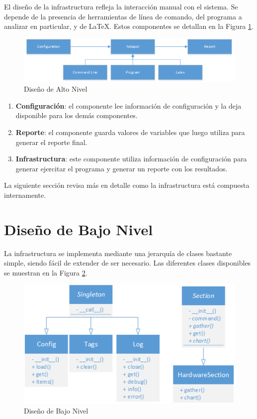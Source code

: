 \documentclass[a4paper]{report}
\begin{document}
El diseño de la infrastructura refleja la interacción manual con el sistema. 
Se depende de la presencia de herramientas de línea de comando, del programa a analizar en particular, y de \LaTeX.
Estos componentes se detallan en la Figura \ref{fig:hotspot-hld}.

\begin{figure}[H]
\begin{center}
\includegraphics[width=\textwidth]{hotspot-hld.png}
\caption{Diseño de Alto Nivel}
\label{fig:hotspot-hld}
\end{center}
\end{figure}

\begin{enumerate}
\item{\bf Configuración}: el componente lee información de configuración y la deja disponible para los demás componentes.
\item{\bf Reporte}: el componente guarda valores de variables que luego utiliza para generar el reporte final. 
\item{\bf Infrastructura}: este componente utiliza información de configuración para generar ejercitar el programa y generar un reporte con los resultados.
\end{enumerate}

La siguiente sección revisa más en detalle como la infrastructura está compuesta internamente.

\section{Diseño de Bajo Nivel}

La infrastructura se implementa mediante una jerarquía de clases bastante simple, siendo fácil de extender de ser necesario.
Las diferentes clases disponibles se muestran en la Figura \ref{fig:hotspot-lld}.

\begin{figure}[H]
\begin{center}
\includegraphics[width=\textwidth]{hotspot-lld.png}
\caption{Diseño de Bajo Nivel}
\label{fig:hotspot-lld}
\end{center}
\end{figure}
\end{document}
